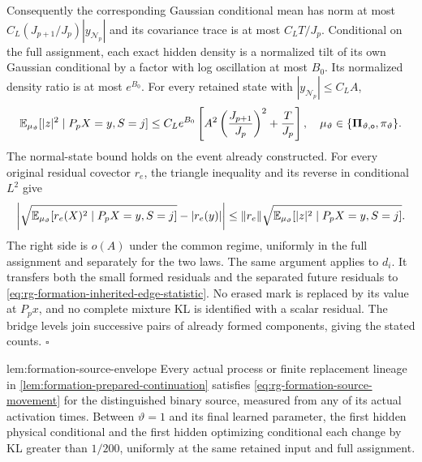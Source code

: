 Consequently the corresponding Gaussian conditional mean has norm
at most $C_L(J_{p+1}/J_p)|y_{\mathcal N_p}|$ and its covariance
trace is at most $C_LT/J_p$. Conditional on the full assignment,
each exact hidden density is a normalized tilt of its own Gaussian
conditional by a factor with log oscillation at most $B_0$.
Its normalized density ratio is at most $e^{B_0}$. For every
retained state with $|y_{\mathcal N_p}|\le C_LA$,
\begin{equation}
 \mathbb E_{\mu_\vartheta}
   [|z|^2\mid P_pX=y,S=j]
 \le C_Le^{B_0}\left[
       A^2\left(\frac{J_{p+1}}{J_p}\right)^2
       +\frac{T}{J_p}\right],
 \quad
 \mu_\vartheta\in
 \{\boldsymbol\Pi_{\vartheta,\mathsf o},\pi_\vartheta\}.
 \label{eq:rg-formation-hidden-original-mark-moment}
\end{equation}
The normal-state bound holds on the event already constructed.
For every original residual covector $r_e$, the triangle inequality
and its reverse in conditional $L^2$ give
\begin{equation}
 \left|
 \sqrt{\mathbb E_{\mu_\vartheta}[r_e(X)^2\mid P_pX=y,S=j]}
 -|r_e(y)|\right|
 \le\|r_e\|
      \sqrt{\mathbb E_{\mu_\vartheta}[|z|^2\mid P_pX=y,S=j]}.
 \label{eq:rg-formation-original-mark-rms}
\end{equation}
The right side is $o(A)$ under the common regime, uniformly in
the full assignment and separately for the two laws. The same
argument applies to $d_i$. It transfers both the small formed
residuals and the separated future residuals to
\cref{eq:rg-formation-inherited-edge-statistic}. No erased mark is
replaced by its value at $P_px$, and no complete mixture KL is
identified with a scalar residual. The bridge levels join successive
pairs of already formed components, giving the stated counts.
\hfill$\square$

{lem:formation-source-envelope}
Every actual process or finite replacement lineage in
\cref{lem:formation-prepared-continuation} satisfies
\cref{eq:rg-formation-source-movement} for the distinguished binary
source, measured from any of its actual activation times. Between
$\vartheta=1$ and its final learned parameter, the first hidden
physical conditional and the first hidden optimizing conditional
each change by KL greater than $1/200$, uniformly at the same
retained input and full assignment. 

